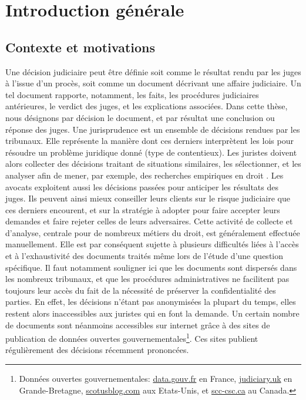 
\chapter*{Introduction générale}
\label{chap:intro}


\section{Contexte et motivations}
\label{sec:intro:contexte}
Une décision judiciaire peut être définie soit comme  le résultat rendu par les juges à l'issue d'un procès, soit comme un document décrivant une affaire judiciaire. Un tel document rapporte, notamment,  les faits, les procédures judiciaires antérieures, le verdict des juges, et les explications associées. Dans cette thèse, nous désignons par \og décision \fg{} le document, et par  \og résultat\fg{} une conclusion ou réponse des juges. Une jurisprudence
est un ensemble de décisions rendues par les tribunaux. Elle représente la manière dont ces derniers interprètent les lois pour résoudre un problème juridique donné (type de contentieux). Les juristes doivent alors collecter des décisions traitant de situations similaires, les sélectionner, et les analyser afin de mener, par exemple, des recherches empiriques en droit \citep{ancel2003expulsion, jeandidier2006pensions}. Les avocats exploitent aussi les décisions passées pour anticiper les résultats des juges. Ils peuvent ainsi mieux conseiller leurs clients sur le risque judiciaire que ces derniers encourent, et sur la stratégie à adopter pour faire accepter leurs demandes et faire rejeter celles de leurs adversaires. Cette activité de collecte et d'analyse, centrale pour de nombreux métiers du droit, est généralement effectuée manuellement. Elle est par conséquent sujette à plusieurs difficultés liées à l'accès et à l'exhaustivité des documents traités même lors de l'étude d'une question spécifique. Il faut notamment souligner ici que les documents sont dispersés dans les nombreux tribunaux, et que les procédures administratives ne facilitent pas toujours leur accès du fait de la nécessité de préserver la confidentialité des parties. En effet, les décisions n'étant pas \og anonymisées \fg{} la plupart du temps, elles restent alors inaccessibles aux juristes qui en font la demande. Un certain nombre de documents sont néanmoins accessibles sur internet grâce à des sites de publication de données ouvertes gouvernementales\footnote{Données ouvertes gouvernementales: \hyperlink{http://data.gouv.fr}{data.gouv.fr} en France, \hyperlink{https://www.judiciary.uk}{judiciary.uk} en Grande-Bretagne, \hyperlink{http://www.scotusblog.com/}{scotusblog.com} aux Etats-Unis, et \hyperlink{https://www.scc-csc.ca/}{scc-csc.ca} au Canada.}. Ces sites publient régulièrement des décisions récemment prononcées. 

